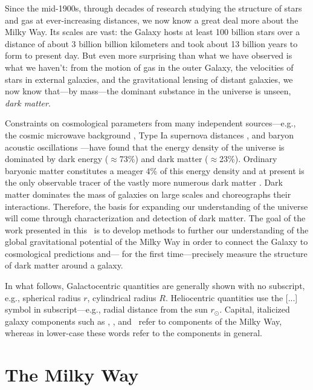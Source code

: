 Since the mid-1900s, through decades of research studying the structure of stars
and gas at ever-increasing distances, we now know a great deal more about the
Milky Way. Its scales are vast: the Galaxy hosts at least 100 billion stars over
a distance of about 3 billion billion kilometers and took about 13 billion years
to form to present day. But even more surprising than what we have observed is
what we haven't: from the motion of gas in the outer Galaxy, the velocities of
stars in external galaxies, and the gravitational lensing of distant galaxies,
we now know that---by mass---the dominant substance in the universe is unseen,
\emph{dark matter}.

Constraints on cosmological parameters from many independent sources---e.g., the
cosmic microwave background \citep{planck15}, Type Ia supernova distances
\citep{riess98, perlmutter99}, and baryon acoustic oscillations
\citep{eisenstein05}---have found that the energy density of the universe is
dominated by dark energy ($\approx$73\%) and dark matter ($\approx$23\%).
Ordinary baryonic matter constitutes a meager 4\% of this energy density and at
present is the only observable tracer of the vastly more numerous dark matter
\citep[though the search for the dark matter particle is underway;][]{aprile11,
luxdm12}. Dark matter dominates the mass of galaxies on large scales and
choreographs their interactions. Therefore, the basis for expanding our
understanding of the universe will come through characterization and detection
of dark matter. The goal of the work presented in this \article\ is to develop
methods to further our understanding of the global gravitational potential of
the Milky Way in order to connect the Galaxy to cosmological predictions and---
for the first time---precisely measure the structure of dark matter around a
galaxy.


In what follows, Galactocentric quantities are generally shown with no
subscript, e.g., spherical radius $r$, cylindrical radius $R$. Heliocentric
quantities use the [...] symbol in subscript---e.g., radial distance from the
sun $r_\odot$. Capital, italicized galaxy components such as \mwdisk, \mwbulge,
and \mwhalo\ refer to components of the Milky Way, whereas in lower-case these
words refer to the components in general.

\section{The Milky Way} \label{sec:milkyway}

